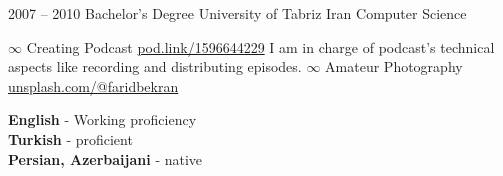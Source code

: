 \documentclass[9pt]{developercv} %
\begin{document}


\begin{entrylist}
	\entry
		{2007 -- 2010}
		{Bachelor's Degree}
		{University of Tabriz Iran}
		{Computer Science}
\end{entrylist}

\begin{entrylist}
		\entry
		{$\infty$}
		{Creating Podcast}
		{\href{https://pod.link/1596644229}{pod.link/1596644229}}
		{I am in charge of podcast's technical aspects like recording and distributing episodes.}
		\entry
		{$\infty$}
		{Amateur Photography}
		{\href{https://unsplash.com/@faridbekran}{unsplash.com/@faridbekran}}
		{}
\end{entrylist}

\begin{minipage}[t]{0.3\textwidth}
	\vspace{-\baselineskip} %

	
	\textbf{English} - Working proficiency\\
	\textbf{Turkish} - proficient\\
	\textbf{Persian, Azerbaijani} - native\\	
\end{minipage}

\end{document}
